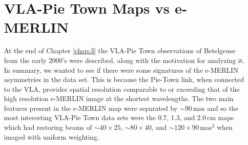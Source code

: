 \section{VLA-Pie Town Maps vs e-MERLIN}\label{sec:5.13}
At the end of Chapter \ref{chap:3} the VLA-Pie Town observations of Betelgeuse from the early 2000's were described, along with the motivation for analyzing it. In summary, we wanted to see if there were some signatures of the e-MERLIN asymmetries in the data set. This is because the Pie-Town link, when connected to the VLA, provides spatial resolution comparable to or exceeding that of the high resolution e-MERLIN image at the shortest wavelengths. The two main features present in the e-MERLIN map were separated by $\sim 90$\,mas and so the most interesting VLA-Pie Town data sets were the 0.7, 1.3, and 2.0\,cm maps which had restoring beams of $\sim 40 \times 25$, $\sim 80 \times 40$, and $\sim 120 \times 90$\,mas$^{2}$ when imaged with uniform weighting. 



